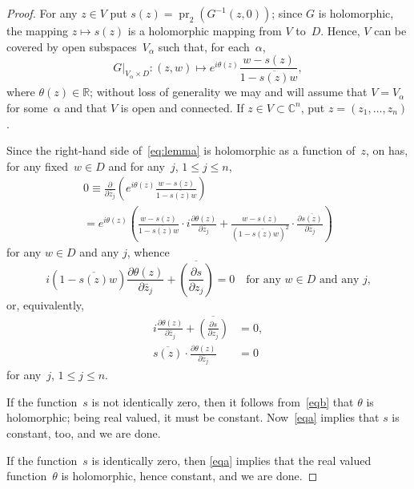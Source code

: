\documentclass[11pt]{amsart}
\newcommand*{\C}{{\mathbb C}}
\newcommand*{\R}{{\mathbb R}}
\DeclareMathOperator{\pr}{pr}
\theoremstyle{remark}
\theoremstyle{definition}
\begin{document}
\begin{proof}
For any $z\in V$ put $s(z)=\pr_2(G^{-1}(z,0))$; since $G$ is holomorphic,
the mapping $z\mapsto s(z)$ is a holomorphic mapping from $V$
to~$D$. Hence, $V$ can be covered by open subspaces~$V_\alpha$ such
that, for each~$\alpha$,
\begin{equation}\label{eq:lemma}
  G|_{V_\alpha\times D}\colon (z,w)\mapsto e^{i\theta(z)}
  \frac{w-s(z)}{1-\overline{s(z)}w},  
\end{equation}
where $\theta(z)\in\R$; without loss of generality we may and will
assume that $V=V_\alpha$
for some~$\alpha$ and that
$V$ is open and connected. If $z\in V\subset\C^n$, put $z=(z_1,\dots,z_n)$.

Since the right-hand side of~\eqref{eq:lemma} is holomorphic as a
function of~$z$, on has, for any fixed~$w\in D$ and for any~$j$, $1\le
j\le n$,
\begin{multline*}
  0\equiv\frac\partial{\partial \bar z_j}
  \left(e^{i\theta(z)}\frac{w-s(z)}{1-\overline{s(z)}w}\right)\\
{}=e^{i\theta(z)}\left(
\frac{w-s(z)}{1-\overline{s(z)}w}\cdot
i\frac{\partial\theta(z)}{\partial \bar z_j}+
\frac{w-s(z)}{(1-\overline{ s(z)}w)^2}\cdot
\frac{\partial\overline{s(z)}}{\partial \bar z_j}\right)
\end{multline*}
for any $w\in D$ and any $j$, whence
\begin{equation*}
  i(1-\overline{s(z)}w)\frac{\partial\theta(z)}{\partial \bar z_j}
  + \overline{\left(\frac{\partial s}{\partial z_j}\right)}
  =0\quad\text{for
any $w\in D$ and any $j$,}  
\end{equation*}
or, equivalently,
\begin{align}
  i\frac{\partial\theta(z)}{\partial \bar
    z_j}+\overline{\left(\frac{\partial s}{\partial z_j}\right)}
  &=0,\label{eqa}\\ 
\overline{s(z)}\cdot \frac{\partial\theta(z)}{\partial \bar
    z_j}&=0\label{eqb}  
\end{align}
for any~$j$, $1\le j\le n$.

If the function~$s$ is not identically zero, then it follows
from~\eqref{eqb} that $\theta$ is holomorphic; being real valued, it
must be constant. Now~\eqref{eqa} implies that $s$ is constant, too,
and we are done.

If the function~$s$ is identically zero, then \eqref{eqa} implies that
the real valued function~$\theta$ is holomorphic, hence 
constant, and we are done.
\end{proof}
\end{document}
